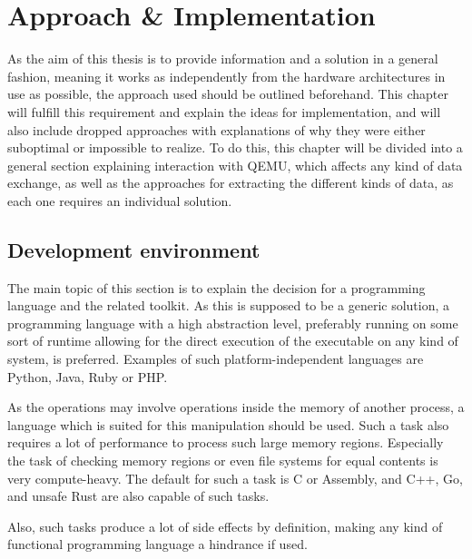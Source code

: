 \chapter{Approach \& Implementation}\label{chap:implementation}
As the aim of this thesis is to provide information and a solution in a general fashion,
meaning it works as independently from the hardware architectures in use as possible,
the approach used should be outlined beforehand.
This chapter will fulfill this requirement
and explain the ideas for implementation,
and will also include dropped approaches with explanations of
why they were either suboptimal or impossible to realize.
To do this, this chapter will be divided into a general section explaining interaction with QEMU,
which affects any kind of data exchange,
as well as the approaches for extracting the different kinds of data,
as each one requires an individual solution.

\section{Development environment}
The main topic of this section is to explain the decision for a programming language and the related toolkit.
As this is supposed to be a generic solution, a programming language with a high abstraction level,
preferably running on some sort of runtime allowing for the direct execution of the executable on any kind of system, is preferred.
Examples of such platform-independent languages are Python, Java, Ruby or PHP.

As the operations may involve operations inside the memory of another process,
a language which is suited for this manipulation should be used.
Such a task also requires a lot of performance to process such large memory regions.
Especially the task of checking memory regions or even file systems for equal contents is very compute-heavy.
The default for such a task is C or Assembly, and C++, Go, and unsafe Rust are also capable of such tasks.

Also, such tasks produce a lot of side effects by definition,
making any kind of functional programming language a hindrance if used.

